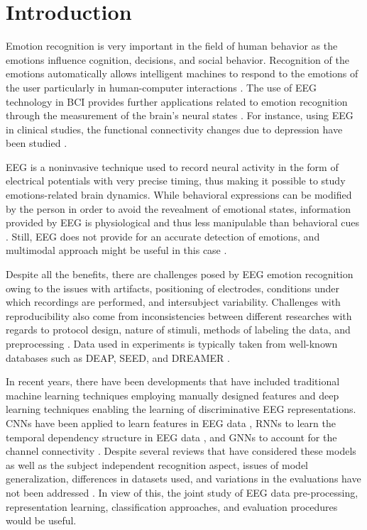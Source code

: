 \documentclass[ASNA,twocolumn]{USG}
\begin{document}
\historydates{}
\maketitle

\section{Introduction}

Emotion recognition is very important in the field of human behavior as the emotions influence cognition, decisions, and social behavior. Recognition of the emotions automatically allows intelligent machines to respond to the emotions of the user particularly in human-computer interactions \cite{moin2023emotion}. The use of EEG technology in BCI provides further applications related to emotion recognition through the measurement of the brain’s neural states \cite{gu2021eeg}. For instance, using EEG in clinical studies, the functional connectivity changes due to depression have been studied \cite{miljevic2023alterations}.

EEG is a noninvasive technique used to record neural activity in the form of electrical potentials with very precise timing, thus making it possible to study emotions-related brain dynamics. While behavioral expressions can be modified by the person in order to avoid the revealment of emotional states, information provided by EEG is physiological and thus less manipulable than behavioral cues \cite{ma2024comprehensive}. Still, EEG does not provide for an accurate detection of emotions, and multimodal approach might be useful in this case \cite{moin2023emotion}.

Despite all the benefits, there are challenges posed by EEG emotion recognition owing to the issues with artifacts, positioning of electrodes, conditions under which recordings are performed, and intersubject variability. Challenges with reproducibility also come from inconsistencies between different researches with regards to protocol design, nature of stimuli, methods of labeling the data, and preprocessing \cite{kukhilava2025evaluation}. Data used in experiments is typically taken from well-known databases such as DEAP, SEED, and DREAMER \cite{katsigiannis2017dreamer}.

In recent years, there have been developments that have included traditional machine learning techniques employing manually designed features and deep learning techniques enabling the learning of discriminative EEG representations. CNNs have been applied to learn features in EEG data \cite{li2022eeg}, RNNs to learn the temporal dependency structure in EEG data \cite{yang2018emotion}, and GNNs to account for the channel connectivity \cite{zhong2020eeg}. Despite several reviews that have considered these models as well as the subject independent recognition aspect, issues of model generalization, differences in datasets used, and variations in the evaluations have not been addressed \cite{geng2025deep}. In view of this, the joint study of EEG data pre-processing, representation learning, classification approaches, and evaluation procedures would be useful.
\end{document}
